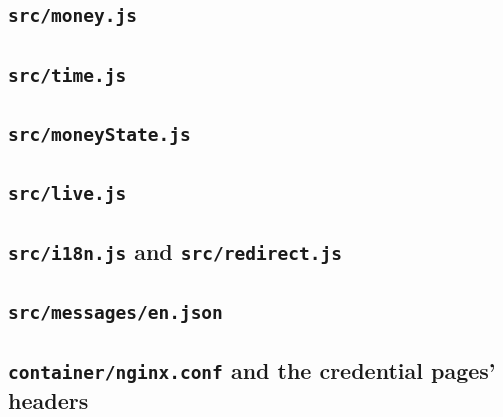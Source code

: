 \documentclass[11pt,a4paper]{article}
\begin{document}
\subsection{\texttt{src/money.js}}

\subsection{\texttt{src/time.js}}

\subsection{\texttt{src/moneyState.js}}

\subsection{\texttt{src/live.js}}

\subsection{\texttt{src/i18n.js} and \texttt{src/redirect.js}}


\subsection{\texttt{src/messages/en.json}}

\subsection{\texttt{container/nginx.conf} and the credential pages' headers}


\end{document}
